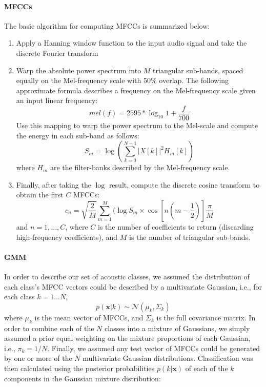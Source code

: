 \documentclass[a4paper,11pt,final]{ThesisStyle}
\begin{document}
\paragraph{MFCCs}
The basic algorithm for computing MFCCs is summarized below:

\begin{enumerate}
\item Apply a Hanning window function to the input audio signal and take the discrete Fourier transform
\item Warp the absolute power spectrum into $M$ triangular sub-bands, spaced equally on the Mel-frequency scale with 50\% overlap.   The following approximate formula describes a frequency on the Mel-frequency scale given an input linear frequency:
\begin{equation}
mel(f) = 2595*\log_{10}{1+\frac{f}{700}}
\end{equation}
Use this mapping to warp the power spectrum to the Mel-scale and compute the energy in each sub-band as follows:
\begin{equation}
S_m = \log{\left(\sum_{k=0}^{N-1}|X[k]|^2H_m[k]\right)}
\end{equation}
where $H_m$ are the filter-banks described by the Mel-frequency scale.
\item Finally, after taking the $\log$ result, compute the discrete cosine transform to obtain the first $C$ MFCCs:
\begin{equation}
c_n = \sqrt{\frac{2}{M}}\sum_{m=1}^{M}(\log{S_m}\times\cos{[n(m-\frac{1}{2})]}\frac{\pi}{M}
\end{equation}
and $n = 1,...,C$, where $C$ is the number of coefficients to return (discarding high-frequency coefficients), and $M$ is the number of triangular sub-bands.
\end{enumerate}
 
\paragraph{GMM}

In order to describe our set of acoustic classes, we assumed the distribution of each class's MFCC vectors could be described by a multivariate Gaussian, i.e., for each class $k = {1...N}$, 
\begin{equation}
p(\mathbf{x}|k) \sim \mathcal{N}(\mu_{k}, \Sigma_{k})  
\end{equation}
where $\mu_{k}$ is the mean vector of MFCCs, and $\Sigma_{k}$ is the full covariance matrix.  In order to combine each of the $N$ classes into a mixture of Gaussians, we simply assumed a prior equal weighting on the mixture proportions of each Gaussian, i.e., $\pi_{k} = 1 / N$.  Finally, we assumed any test vector of MFCCs could be generated by one or more of the $N$ multivariate Gaussian distributions.  Classification was then calculated using the posterior probabilities $p(k|\mathbf{x})$ of each of the $k$ components in the Gaussian mixture distribution:
\end{document}
